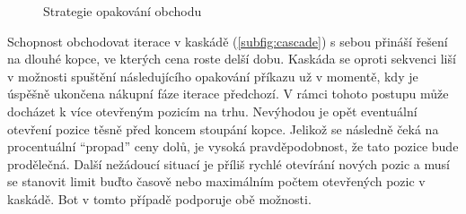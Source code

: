 \begin{figure}[ht]
    \centering
    \qquad

    \qquad
    \caption{Strategie opakování obchodu}
    \label{fig:trade-repeat}
\end{figure}

Schopnost obchodovat iterace v kaskádě (\ref{subfig:cascade}) s sebou přináší řešení na dlouhé kopce, ve kterých cena roste delší dobu. Kaskáda se oproti sekvenci liší v možnosti spuštění
následujícího opakování příkazu
už v momentě, kdy je úspěšně ukončena nákupní fáze iterace předchozí. V rámci tohoto postupu může docházet k více otevřeným pozicím na trhu. Nevýhodou je opět eventuální otevření pozice těsně před koncem stoupání
kopce. Jelikož se následně čeká na procentuální \enquote{propad} ceny dolů, je vysoká pravděpodobnost, že tato pozice bude prodělečná. Další nežádoucí situací je příliš rychlé otevírání
nových pozic a musí se stanovit limit buďto časově nebo maximálním počtem otevřených pozic v kaskádě. Bot v tomto případě podporuje obě možnosti.

